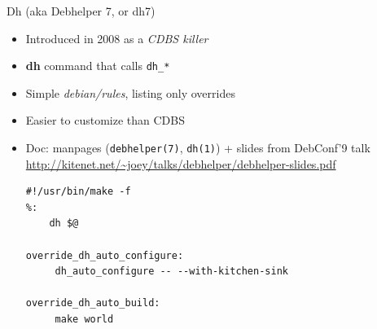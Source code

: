 \documentclass[10pt,final]{beamer}
\begin{document}
\begin{frame}[fragile]{Dh (aka Debhelper 7, or dh7)}
  \begin{itemize}
  \item Introduced in 2008 as a \textsl{CDBS killer}
    \hbr
  \item \textbf{dh} command that calls \texttt{dh\_*}
    \hbr
  \item Simple \textsl{debian/rules}, listing only overrides
    \hbr
  \item Easier to customize than CDBS
    \hbr
  \item Doc: manpages (\texttt{debhelper(7)}, \texttt{dh(1)}) + slides from DebConf'9 talk\\
    \url{http://kitenet.net/~joey/talks/debhelper/debhelper-slides.pdf}
    \br
    \begin{lstlisting}[basicstyle=\ttfamily\footnotesize]
#!/usr/bin/make -f
%:
    dh $@

override_dh_auto_configure:
     dh_auto_configure -- --with-kitchen-sink

override_dh_auto_build:
     make world

    \end{lstlisting}
  \end{itemize} %
\end{frame}
\end{document}
